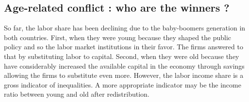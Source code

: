 

\subsection{Age-related conflict : who are the winners ?}

So far, the labor share has been declining due to the baby-boomers generation in both countries. First, when they were young because they shaped the public policy and so the labor market institutions in their favor. The firms answered to that by substituting labor to capital. Second, when they were old because they have considerably increased the available capital in the economy through savings allowing the firms to substitute even more. However, the labor income share is a gross indicator of inequalities. A more appropriate indicator may be the income ratio between young and old after redistribution. 

